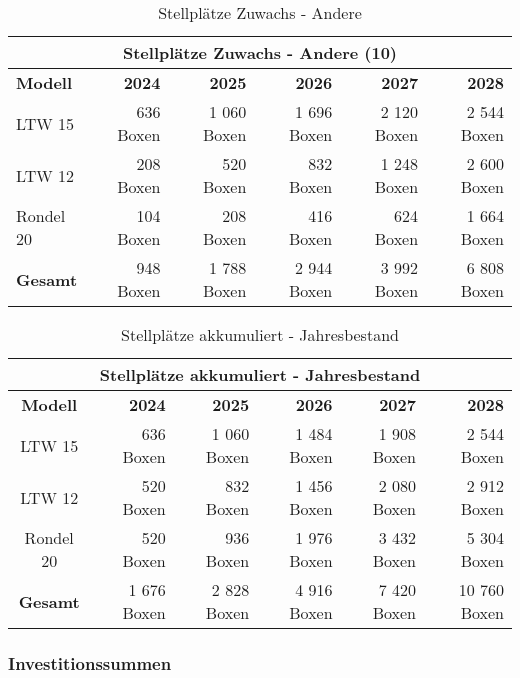 \begin{table}[H]
  \centering
  \begin{tabular}{lrrrrr}
    \multicolumn{6}{c}{\textbf{Stellplätze Zuwachs - Andere (10)}}                                  \\
    \toprule
    \textbf{Modell} & \textbf{2024} & \textbf{2025} & \textbf{2026} & \textbf{2027} & \textbf{2028} \\
    \midrule
    LTW 15          & 636 Boxen     & 1 060 Boxen   & 1 696 Boxen   & 2 120 Boxen   & 2 544 Boxen   \\
    LTW 12          & 208 Boxen     & 520 Boxen     & 832 Boxen     & 1 248 Boxen   & 2 600 Boxen   \\
    Rondel 20       & 104 Boxen     & 208 Boxen     & 416 Boxen     & 624 Boxen     & 1 664 Boxen   \\
    \midrule
    \textbf{Gesamt} & 948 Boxen     & 1 788 Boxen   & 2 944 Boxen   & 3 992 Boxen   & 6 808 Boxen   \\
    \bottomrule
  \end{tabular}
  \caption{Stellplätze Zuwachs - Andere}
  \label{tab:stellplaetze_zuwachs_andere}
\end{table}

\begin{table}[H]
  \centering
  \begin{tabular}{crrrrr}
    \multicolumn{6}{c}{\textbf{Stellplätze akkumuliert - Jahresbestand}}                            \\
    \toprule
    \textbf{Modell} & \textbf{2024} & \textbf{2025} & \textbf{2026} & \textbf{2027} & \textbf{2028} \\
    \midrule
    LTW 15          & 636 Boxen     & 1 060 Boxen   & 1 484 Boxen   & 1 908 Boxen   & 2 544 Boxen   \\
    LTW 12          & 520 Boxen     & 832 Boxen     & 1 456 Boxen   & 2 080 Boxen   & 2 912 Boxen   \\
    Rondel 20       & 520 Boxen     & 936 Boxen     & 1 976 Boxen   & 3 432 Boxen   & 5 304 Boxen   \\
    \midrule
    \textbf{Gesamt} & 1 676 Boxen   & 2 828 Boxen   & 4 916 Boxen   & 7 420 Boxen   & 10 760 Boxen  \\
    \bottomrule
  \end{tabular}
  \caption{Stellplätze akkumuliert - Jahresbestand}
  \label{tab:stellplaetze_akkumuliert}
\end{table}

\subsubsection{Investitionssummen}

